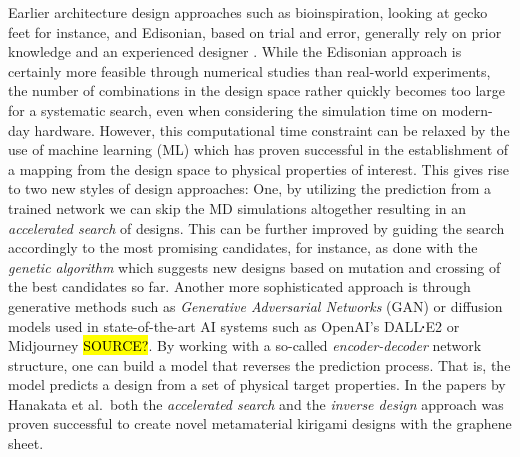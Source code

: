 



Earlier architecture design approaches such as bioinspiration, looking at gecko
feet for instance, and Edisonian, based on trial and error, generally rely on
prior knowledge and an experienced designer \cite{Mao}. While the Edisonian
approach is certainly more feasible through numerical studies than real-world
experiments, the number of combinations in the design space rather quickly
becomes too large for a systematic search, even when considering the simulation
time on modern-day hardware. However, this computational time constraint can be
relaxed by the use of machine learning (\acrshort{ML}) which has proven
successful in the establishment of a mapping from the design space to physical properties of interest. This gives rise to two new styles of design
approaches: One, by utilizing the prediction from a trained network we can skip
the \acrshort{MD} simulations altogether resulting in an \textit{accelerated
search} of designs. This can be further improved by guiding the search
accordingly to the most promising candidates, for instance, as done with the
\textit{genetic algorithm} which suggests new designs based on mutation and
crossing of the best candidates so far. Another more sophisticated
approach is through generative methods such as \textit{Generative Adversarial
Networks} (GAN) or diffusion models used in state-of-the-art AI systems such as OpenAI's DALL$\sq$E2 or Midjourney \hl{SOURCE?}. By working with a so-called \textit{encoder-decoder} network
structure, one can build a model that reverses the prediction process. That is,
the model predicts a design from a set of physical target properties. In the
papers by Hanakata et al.\ both the \textit{accelerated search} and the
\textit{inverse design} approach was proven successful to create novel
metamaterial kirigami designs with the graphene sheet. 

